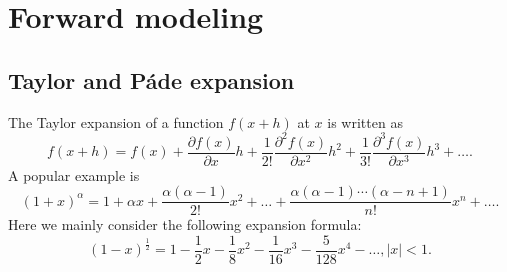 % 



\section{Forward modeling}

\subsection{Taylor and P\'{a}de expansion}

The Taylor expansion of a function $f(x+h)$ at $x$ is written as
\begin{equation}
f(x+h)=f(x)+\frac{\partial f(x)}{\partial x}h+\frac{1}{2!}\frac{\partial^2 f(x)}{\partial x^2}h^2+\frac{1}{3!}\frac{\partial^3 f(x)}{\partial x^3}h^3+\ldots.
\end{equation}
A popular example is
\begin{equation}
(1+x)^{\alpha}=1+\alpha x+\frac{\alpha(\alpha-1)}{2!}x^2+\ldots+\frac{\alpha(\alpha-1)\cdots(\alpha-n+1)}{n!}x^n+\ldots.
\end{equation}
Here we mainly consider the following expansion formula:
\begin{equation}\label{eq: taylor1}
(1-x)^{\frac{1}{2}}=1-\frac{1}{2}x-\frac{1}{8}x^2-\frac{1}{16}x^3-\frac{5}{128}x^4-\ldots, |x|<1.
\end{equation}


